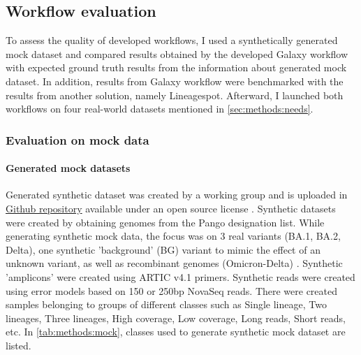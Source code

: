     \subsection{Workflow evaluation} \label{sec:methods:evaluation}
    To assess the quality of developed workflows, I used a synthetically generated mock dataset and compared results obtained by the developed Galaxy workflow with expected ground truth results from the information about generated mock dataset. In addition, results from Galaxy workflow were benchmarked with the results from another solution, namely Lineagespot. Afterward, I launched both workflows on four real-world datasets mentioned in \cref{sec:methods:needs}.
        
        \subsubsection{Evaluation on mock data} \label{sec:methods:evaluation:mock}
            \paragraph{Generated mock datasets}
            Generated synthetic dataset was created by a working group and is uploaded in \href{https://github.com/suskraem/ww_benchmark}{Github repository} available under an open source license \cite{benchmarksamples}. Synthetic datasets were created by obtaining genomes from the Pango designation list. While generating synthetic mock data, the focus was on 3 real variants (BA.1, BA.2, Delta), one synthetic 'background' (BG) variant to mimic the effect of an unknown variant, as well as recombinant genomes (Omicron-Delta) \cite{simonloriere2011,variants}. Synthetic 'amplicons' were created using ARTIC v4.1 primers. Synthetic reads were created using error models based on 150 or 250bp NovaSeq reads. There were created samples belonging to groups of different classes such as Single lineage, Two lineages, Three lineages, High coverage, Low coverage, Long reads, Short reads, etc. In \cref{tab:methods:mock}, classes used to generate synthetic mock dataset are listed.
            
